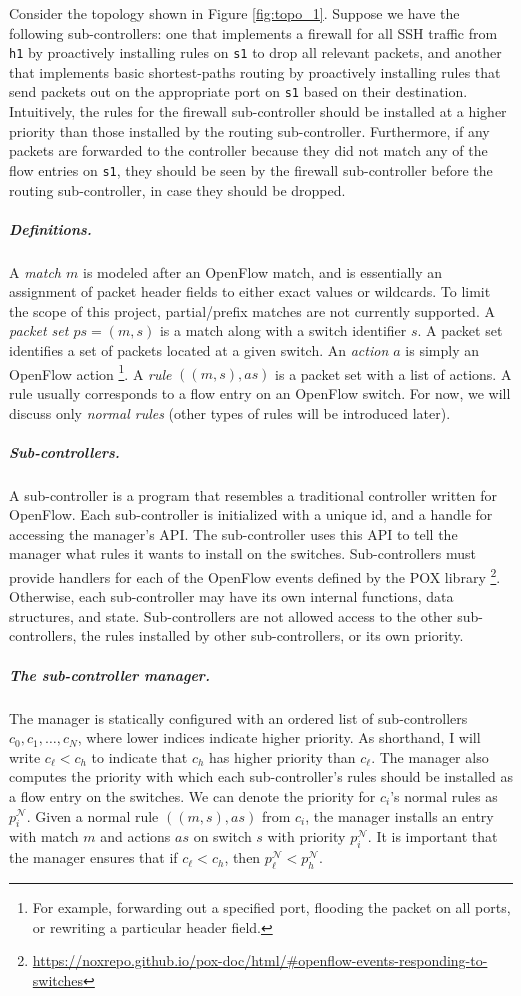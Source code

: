 \documentclass{article}
\begin{document}
Consider the topology shown in Figure \ref{fig:topo_1}. Suppose we have
the following sub-controllers: one that implements a 
firewall for all SSH traffic from \texttt{h1} by proactively installing
rules on \texttt{s1} to drop all relevant packets, and another that
implements basic shortest-paths routing by proactively installing rules
that send packets out on the appropriate port on \texttt{s1} based on their
destination. 
Intuitively, the rules for the firewall sub-controller should be installed 
at a higher priority than those installed by the routing sub-controller.
Furthermore, if any packets are forwarded to the controller because
they did not match any of the flow entries on \texttt{s1}, they should be seen
by the firewall sub-controller before the routing sub-controller,
in case they should be dropped.

\subparagraph{Definitions.}
A \emph{match $m$} is modeled after an
OpenFlow match, and is essentially an assignment of packet header fields to
either exact values or wildcards.
To limit the scope of this project, partial/prefix matches are
not currently supported.
A \emph{packet set $ps = (m, s)$} is a match along with a switch identifier $s$. 
A packet set identifies a set of packets located at a given switch.
An \emph{action $a$} is simply an OpenFlow action
\footnote{For example, forwarding out a specified port, flooding the packet
on all ports, or rewriting a particular header field.}.
A \emph{rule} $((m, s), as)$ is a packet set with a list of actions.
A rule usually corresponds to a flow entry on an OpenFlow switch.
For now, we will discuss only \emph{normal rules} (other types of rules
will be introduced later).

\subparagraph{Sub-controllers.}
A sub-controller is a program that resembles a traditional controller
written for OpenFlow.
Each sub-controller is initialized with a unique id, and a handle for
accessing the manager's API. 
The sub-controller uses this API to tell the manager what rules it wants to 
install on the switches.
Sub-controllers must provide handlers for
each of the OpenFlow events defined by the POX library
\footnote{\url{https://noxrepo.github.io/pox-doc/html/\#openflow-events-responding-to-switches}}.
Otherwise, each sub-controller may have its own internal functions,
data structures, and state.
Sub-controllers are not allowed access to the other sub-controllers,
the rules installed by other sub-controllers, or its own priority.

\subparagraph{The sub-controller manager.}
The manager is statically configured with an ordered list of sub-controllers
$c_{0}, c_{1}, \dots, c_N$, where lower indices indicate higher priority.
As shorthand, I will write $c_{\ell} < c_h$ to indicate that $c_h$ has
higher priority than $c_{\ell}$. 
The manager also computes the priority with which each sub-controller's 
rules should be installed as a flow entry on the switches. 
We can denote the priority for $c_i$'s normal rules as $p_i^{\mathcal{N}}$. 
Given a normal rule $((m, s), as)$ from $c_i$, the manager installs an entry
with match $m$ and actions $as$ on switch $s$ with priority $p_i^{\mathcal{N}}$.
It is important that the manager ensures that if $c_{\ell} < c_h$,
then $p_{\ell}^{\mathcal{N}} < p_h^{\mathcal{N}}$.
\end{document}
